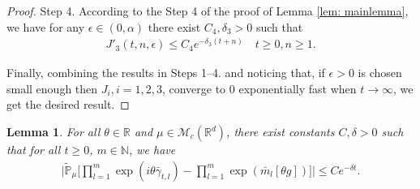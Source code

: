 \documentclass[12pt,a4paper]{amsart}
\theoremstyle{plain}
\newtheorem{lem}[thm]{Lemma}
\theoremstyle{definition}
\numberwithin{equation}{section}
\begin{document}
\begin{proof}
    Step 4. According to the Step 4 of the proof of  Lemma \ref{lem: mainlemma}, we have for any $\epsilon\in (0,  \alpha)$ there exist $C_4,\delta_3>0$ such that
\begin{align}\label{ineq: control of J31}
    J'_3(t,n,\epsilon)\leq C_4e^{-\delta_3 (t+n)}\quad t\geq0, n\geq 1.
\end{align}

    Finally, combining the results in Steps 1--4. and noticing that, if $\epsilon>0$ is chosen small enough then $J_{i}, i = 1,2,3$, converge to $0$ exponentially fast when $t\rightarrow\infty$, we get the desired result.
\end{proof}

\begin{lem}\label{lem: independency for large rate}
    For all $\theta\in \mathbb{R}$ and $\mu \in \mathcal{M}_c(\mathbb{R}^d)$, there exist constants $C,\delta>0$ such that for all $t\geq 0$, $m\in\mathbb{N}$, we have
\begin{align}\label{ineq: next we will need}
    \bigg|\widetilde{\mathbb{P}}_{\mu}\Big[\prod_{l=1}^m\exp(i\theta\bar{\gamma}_{t,l})-\prod_{l=1}^m\exp(\bar{m}_l[\theta g])\Big]\bigg|\leq C e^{-\delta t}.
\end{align}
\end{lem}
\end{document}
